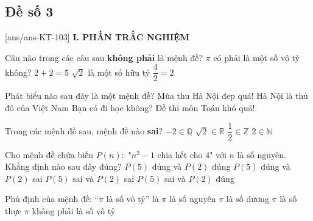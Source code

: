 \subsection*{Đề số 3}
\setcounter{ex}{0}\setcounter{bt}{0}
[ans/ans-KT-103]
\noindent\textbf{I. PHẦN TRẮC NGHIỆM}
\begin{ex}%
	Câu nào trong các câu sau \textbf{không phải} là mệnh đề?
	\choice
	{\True $\pi$ có phải là một số vô tỷ không?}
	{$2+2=5$}
	{$\sqrt{2}$ là một số hữu tỷ}
	{$\dfrac{4}{2}=2$}
\end{ex}
\begin{ex}%
	Phát biểu nào sau đây là một mệnh đề?
	\choice
	{Mùa thu Hà Nội đep quá!}
	{\True Hà Nội là thủ đô của Việt Nam}
	{Bạn có đi học không?}
	{Đề thi môn Toán khó quá!}
\end{ex}
\begin{ex}%
	Trong các mệnh đề sau, mệnh đề nào \textbf{sai}?
	\choice
	{$-2 \in \mathbb{Q}$}
	{$\sqrt{2} \in \mathbb{R}$}
	{\True $\dfrac{1}{2} \in \mathbb{Z}$}
	{$2 \in \mathbb{N}$}
\end{ex}
\begin{ex}%
	Cho mệnh đề chứa biến $P(n) \colon$ "$n^2-1$ chia hết cho $4$" với $n$ là số nguyên. Khẳng định nào sau đây đúng?
	\choice
	{$P(5)$ đúng và $P(2)$ đúng}
	{\True $P(5)$ đúng và $P(2)$ sai}
	{$P(5)$ sai và $P(2)$ sai}
	{$P(5)$ sai và $P(2)$ đúng}
\end{ex}
\begin{ex}%
	Phủ định của mệnh đề: ``$\pi$ là số vô tỷ'' là
	\choice
	{$\pi$ là số nguyên}
	{$\pi$ là số dương}
	{$\pi$ là số thực}
	{\True $\pi$ không phải là số vô tỷ}	
\end{ex}
